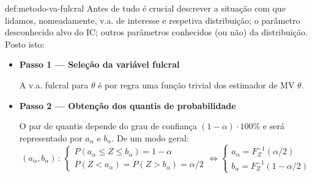 \vspace{-1em}
\begin{theo}{def:metodo-va-fulcral}\label{def:metodo-va-fulcral}
    \noindent Antes de tudo é crucial descrever a situação com que lidamos, nomeadamente, v.a. de interesse e respetiva distribuição; o parâmetro desconhecido alvo do IC; outros parâmetros conhecidos (ou não) da distribuição. Posto isto:

    \begin{itemize}
        \item \textbf{Passo 1 --- Seleção da variável fulcral}

            A v.a. fulcral para $\theta$ é por regra uma função trivial dos estimador de MV $\theta$.
        \item \textbf{Passo 2 --- Obtenção dos quantis de probabilidade}

            O par de quantis depende do grau de confiança $(1 - \alpha) \cdot 100 \%$ e será representado por 
            $a_\alpha$ e $b_\alpha$. De um modo geral:
            $$
                (a_\alpha, b_\alpha)\, :\, \left\{\begin{array}{ll}
                     P(a_\alpha \leq Z \leq b_\alpha) = 1 - \alpha\\
                     P(Z < a_\alpha) = P(Z > b_\alpha) = \alpha/2
                \end{array}\right.\iff
                \left\{\begin{array}{ll}
                     a_\alpha = F_Z^{-1}(\alpha/2)\\
                     b_\alpha = F_Z^{-1}(1 - \alpha/2)
                \end{array}\right.
            $$
    \end{itemize}
\end{theo}


